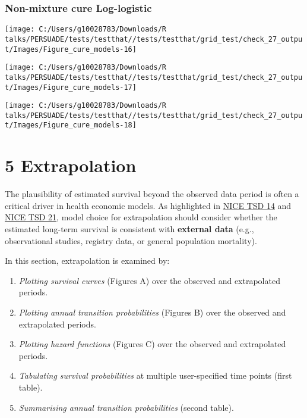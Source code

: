 \documentclass[
]{article}
\providecommand{\tightlist}{%
  \setlength{\itemsep}{0pt}\setlength{\parskip}{0pt}}
\begin{document}
\clearpage

\subsubsection{Non-mixture cure
Log-logistic}\label{non-mixture-cure-log-logistic}

\begin{flushleft}\texttt{[image: C:/Users/g10028783/Downloads/R talks/PERSUADE/tests/testthat//tests/testthat/grid\_test/check\_27\_output/Images/Figure\_cure\_models-16]} \end{flushleft}

\begin{flushleft}\texttt{[image: C:/Users/g10028783/Downloads/R talks/PERSUADE/tests/testthat//tests/testthat/grid\_test/check\_27\_output/Images/Figure\_cure\_models-17]} \end{flushleft}

\begin{flushleft}\texttt{[image: C:/Users/g10028783/Downloads/R talks/PERSUADE/tests/testthat//tests/testthat/grid\_test/check\_27\_output/Images/Figure\_cure\_models-18]} \end{flushleft}

\clearpage

\section{5 Extrapolation}\label{extrapolation}

The plausibility of estimated survival beyond the observed data period
is often a critical driver in health economic models. As highlighted in
\href{https://nicedsu.org.uk/wp-content/uploads/2016/03/NICE-DSU-TSD-Survival-analysis.updated-March-2013.v2.pdf}{NICE
TSD 14} and \href{https://www.sheffield.ac.uk/media/34188/download}{NICE
TSD 21}, model choice for extrapolation should consider whether the
estimated long-term survival is consistent with \textbf{external data}
(e.g., observational studies, registry data, or general population
mortality).

In this section, extrapolation is examined by:

\begin{enumerate}
\def\labelenumi{\arabic{enumi}.}
\tightlist
\item
  \emph{Plotting survival curves} (Figures A) over the observed and
  extrapolated periods.\\
\item
  \emph{Plotting annual transition probabilities} (Figures B) over the
  observed and extrapolated periods.
\item
  \emph{Plotting hazard functions} (Figures C) over the observed and
  extrapolated periods.
\item
  \emph{Tabulating survival probabilities} at multiple user-specified
  time points (first table).
\item
  \emph{Summarising annual transition probabilities} (second table).
\end{enumerate}
\end{document}
